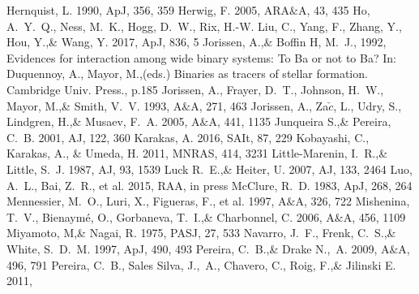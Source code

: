 \documentclass[a4paper,fleqn,usenatbib]{mnras}
\begin{document}
\begin{thebibliography}{99}
Hernquist, L. 1990, 
ApJ, 356, 359
Herwig, F. 2005, 
ARA$\&$A, 43, 435
Ho, A.~Y.~Q., Ness, M.~K., Hogg, D.~W., Rix, H.-W. Liu, C., Yang, F., Zhang, Y., Hou, Y.,\& Wang, Y. 2017, 
ApJ, 836, 5
Jorissen, A.,\& Boffin H, M.~J., 1992, 
Evidences for interaction among wide binary systems: To Ba or not to Ba? In: Duquennoy, A., Mayor, M.,(eds.) Binaries as tracers of stellar formation. Cambridge Univ. Press., p.185
Jorissen, A., Frayer, D.~T., Johnson, H.~W., Mayor, M.,\& Smith, V.~V. 1993, 
A$\&$A, 271, 463
Jorissen, A., Za$\check{c}$, L., Udry, S., Lindgren, H.,\& Musaev, F.~A. 2005, 
A$\&$A, 441, 1135
Junqueira S.,\& Pereira, C.~B. 2001, 
AJ, 122, 360
Karakas, A. 2016, 
SAIt, 87, 229
Kobayashi, C., Karakas, A., \& Umeda, H. 2011, 
MNRAS, 414, 3231
Little-Marenin, I.~R.,\& Little, S.~J. 1987, 
AJ, 93, 1539
Luck R.~E.,\& Heiter, U. 2007, 
AJ, 133, 2464
Luo, A.~L., Bai, Z.~R., et al. 2015, 
RAA, in press
McClure, R.~D. 1983, 
ApJ, 268, 264
Mennessier, M.~O., Luri, X., Figueras, F., et al. 1997, 
A$\&$A, 326, 722
Mishenina, T.~V., Bienaym\' e, O., Gorbaneva, T.~I.,\& Charbonnel, C. 2006, 
A$\&$A, 456, 1109
Miyamoto, M,\& Nagai, R. 1975, 
PASJ, 27, 533
Navarro, J.~F., Frenk, C.~S.,\& White, S.~D.~M. 1997, 
ApJ, 490, 493
Pereira, C.~B.,\& Drake N.,~A. 2009, 
A$\&$A, 496, 791
Pereira, C.~B., Sales Silva, J.,~A., Chavero, C., Roig, F.,\& Jilinski E. 2011, 

\end{thebibliography}
\end{document}
